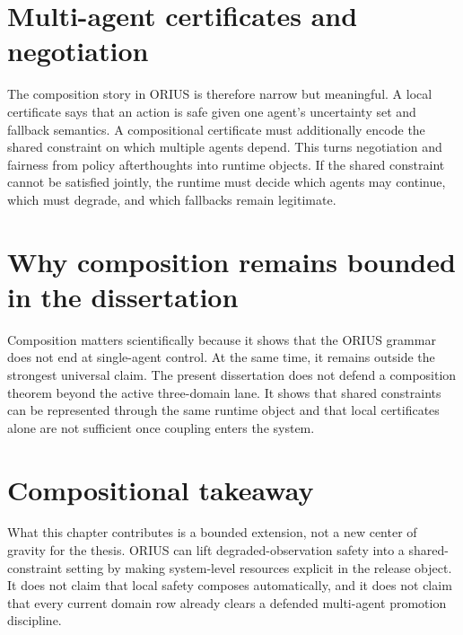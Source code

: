 \section{Multi-agent certificates and negotiation}
The composition story in ORIUS is therefore narrow but meaningful. A local certificate says
that an action is safe given one agent's uncertainty set and fallback semantics. A
compositional certificate must additionally encode the shared constraint on which multiple
agents depend. This turns negotiation and fairness from policy afterthoughts into runtime
objects. If the shared constraint cannot be satisfied jointly, the runtime must decide which
agents may continue, which must degrade, and which fallbacks remain legitimate.

\section{Why composition remains bounded in the dissertation}
Composition matters scientifically because it shows that the ORIUS grammar does not end at
single-agent control. At the same time, it remains outside the strongest universal claim.
The present dissertation does not defend a composition theorem beyond the active
three-domain lane. It shows that shared constraints can be represented through the same
runtime object and that local certificates alone are not sufficient once coupling enters
the system.

\section{Compositional takeaway}
What this chapter contributes is a bounded extension, not a new center of gravity for the
thesis. ORIUS can lift degraded-observation safety into a shared-constraint setting by
making system-level resources explicit in the release object. It does not claim that local
safety composes automatically, and it does not claim that every current domain row already
clears a defended multi-agent promotion discipline.
